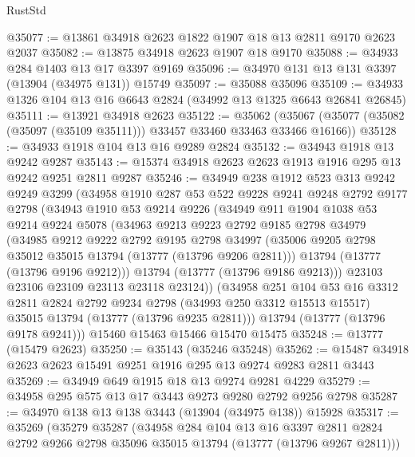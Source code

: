 \begin{lexlean}{RustStd}
\begin{coremodule}
@35077 := @13861 @34918 @2623 @1822 @1907 @18 @13 @2811 @9170 @2623 @2037
@35082 := @13875 @34918 @2623 @1907 @18 @9170
@35088 := @34933 @284 @1403 @13 @17 @3397 @9169
@35096 := @34970 @131 @13 @131 @3397 (@13904 (@34975 @131)) @15749
@35097 := @35088 @35096
@35109 := @34933 @1326 @104 @13 @16 @6643 @2824 (@34992 @13 @1325 @6643 @26841 @26845)
@35111 := @13921 @34918 @2623
@35122 := @35062
    (@35067 (@35077 (@35082 (@35097 (@35109 @35111))) @33457 @33460 @33463 @33466 @16166))
@35128 := @34933 @1918 @104 @13 @16 @9289 @2824
@35132 := @34943 @1918 @13 @9242 @9287
@35143 := @15374 @34918 @2623 @2623 @1913 @1916 @295 @13 @9242 @9251 @2811 @9287
@35246 := @34949
    @238
    @1912
    @523
    @313
    @9242
    @9249
    @3299
    (@34958
      @1910
      @287
      @53
      @522
      @9228
      @9241
      @9248
      @2792
      @9177
      @2798
      (@34943
        @1910
        @53
        @9214
        @9226
        (@34949
          @911
          @1904
          @1038
          @53
          @9214
          @9224
          @5078
          (@34963
            @9213
            @9223
            @2792
            @9185
            @2798
            @34979
            (@34985
              @9212
              @9222
              @2792
              @9195
              @2798
              @34997
              (@35006 @9205 @2798 @35012 @35015 @13794 (@13777 (@13796 @9206 @2811)))
              @13794
              (@13777 (@13796 @9196 @9212)))
            @13794
            (@13777 (@13796 @9186 @9213)))
          @23103
          @23106
          @23109
          @23113
          @23118
          @23124))
      (@34958
        @251
        @104
        @53
        @16
        @3312
        @2811
        @2824
        @2792
        @9234
        @2798
        (@34993 @250 @3312 @15513 @15517)
        @35015
        @13794
        (@13777 (@13796 @9235 @2811)))
      @13794
      (@13777 (@13796 @9178 @9241)))
    @15460
    @15463
    @15466
    @15470
    @15475
@35248 := @13777 (@15479 @2623)
@35250 := @35143 (@35246 @35248)
@35262 := @15487 @34918 @2623 @2623 @15491 @9251 @1916 @295 @13 @9274 @9283 @2811 @3443
@35269 := @34949 @649 @1915 @18 @13 @9274 @9281 @4229
@35279 := @34958 @295 @575 @13 @17 @3443 @9273 @9280 @2792 @9256 @2798
@35287 := @34970 @138 @13 @138 @3443 (@13904 (@34975 @138)) @15928
@35317 := @35269
    (@35279
      @35287
      (@34958
        @284
        @104
        @13
        @16
        @3397
        @2811
        @2824
        @2792
        @9266
        @2798
        @35096
        @35015
        @13794
        (@13777 (@13796 @9267 @2811)))

\end{coremodule}
\end{lexlean}
